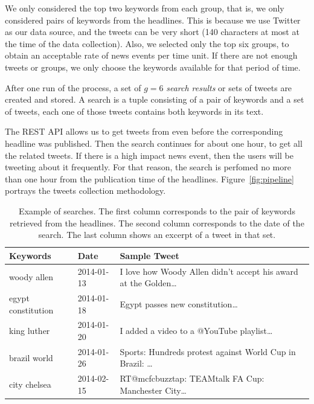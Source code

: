 We only considered the top two keywords from each group, that is, we only
considered pairs of keywords from the headlines. 
%
This is because we use Twitter as our data source, and the tweets can be very
short (140 characters at most at the time of the data collection). 
%
Also, we selected only the top six groups, to obtain an acceptable rate of news
events per time unit. 
%
If there are not enough tweets or groups, we only choose the keywords available
for that period of time.

After one run of the process, a set of $g=6$ \emph{search results} or sets of
tweets are created and stored. 
%
A search is a tuple consisting of a pair of keywords and a set of tweets, each
one of those tweets contains both keywords in its text.

The REST API allows us to get tweets from even before the corresponding headline
was published.
%
Then the search continues for about one hour, to get all the related tweets. 
%
If there is a high impact news event, then the users will be tweeting about it
frequently. 
%
For that reason, the search is perfomed no more than one hour from the
publication time of the headlines. 
%
Figure~\ref{fig:pipeline} portrays the tweets collection methodology.



\begin{table}
{\small
\begin{center}
\begin{tabular}{lll}
\toprule
 Keywords            &  Date       &  Sample Tweet                                                                                                                                                                                                                     \\
\midrule
 woody allen         &  2014-01-13  &  I love how Woody Allen didn't
 accept his award at the Golden\ldots{} \\
 egypt constitution  &  2014-01-18  &  Egypt passes new constitution\ldots{} \\
 king luther         &  2014-01-20  &  I added a video to a @YouTube
 playlist\ldots{} \\
 brazil world        &  2014-01-26  &  Sports: Hundreds protest against
 World Cup in Brazil: \ldots{} \\
 city chelsea        &  2014-02-15  &  RT@mcfcbuzztap: TEAMtalk FA Cup:
 Manchester City\ldots{} \\
 \bottomrule
\end{tabular}
\end{center}
} \caption[Example of searches.]{Example of searches. The first column
corresponds to the pair of keywords retrieved from the headlines. The second
column corresponds to the date of the search. The last column shows an excerpt
of a tweet in that set.}\label{table:searches}
\end{table}

